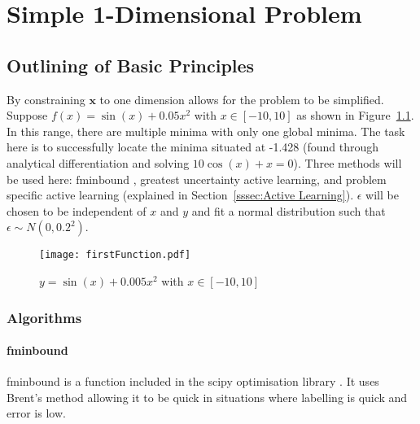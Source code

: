 
\chapter{Simple 1-Dimensional Problem}

\ifpdf
    \graphicspath{{Chapter2/Figs/Raster/}{Chapter2/Figs/PDF/}{Chapter2/Figs/}}
\else
    \graphicspath{{Chapter2/Figs/Vector/}{Chapter2/Figs/}}
\fi


\section{Outlining of Basic Principles}

By constraining $\bm{x}$ to one dimension allows for the problem to be simplified. Suppose ${f(x)=\sin(x)+0.05x^2}$ with ${x\in [-10, 10]}$ as shown in Figure~\ref{fig:firstFunction}. In this range, there are multiple minima with only one global minima. The task here is to successfully locate the minima situated at -1.428 (found through analytical differentiation and solving ${10\cos(x)+x=0}$). Three methods will be used here: $\text{fminbound}$ \cite{2020SciPy-NMeth}, greatest uncertainty active learning, and problem specific active learning (explained in Section~\ref{sssec:Active Learning}). $\epsilon$ will be chosen to be independent of $x$ and $y$ and fit a normal distribution such that ${\epsilon\sim N(0, 0.2^2)}$.

\begin{figure}[htbp!] 
\centering    
\texttt{[image: firstFunction.pdf]}
\caption[First Function]{$y = \sin(x) + 0.005x^2$ with $x\in [-10, 10]$}
\label{fig:firstFunction}
\end{figure}

\subsection{Algorithms}
\label{ssec: algorithms}
\subsubsection{fminbound}
fminbound is a function included in the scipy optimisation library \cite{2020SciPy-NMeth}. It uses Brent's method allowing it to be quick in situations where labelling is quick and error is low.

